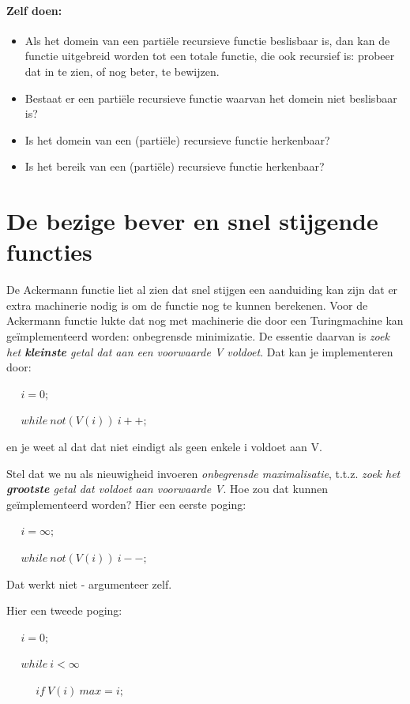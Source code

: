 \paragraph{Zelf doen:}
\begin{itemize}
\item[]
Als het domein van een parti\"ele recursieve functie beslisbaar is, dan
kan de functie uitgebreid worden tot een totale functie, die ook
recursief is: probeer dat in te zien, of nog beter, te bewijzen.
\item[]
Bestaat er een parti\"ele recursieve functie waarvan het domein niet
beslisbaar is?
\item[]
Is het domein van een (parti\"ele) recursieve functie herkenbaar?
\item[]
Is het bereik van een (parti\"ele) recursieve functie herkenbaar?
\end{itemize}



\section{De bezige bever en snel stijgende functies}

De Ackermann functie liet al zien dat snel stijgen een aanduiding kan
zijn dat er extra machinerie nodig is om de functie nog te kunnen
berekenen. Voor de Ackermann functie lukte dat nog met machinerie die
door een Turingmachine kan ge\"{i}mplementeerd worden: onbegrensde
minimizatie. De essentie daarvan is {\em zoek het {\bf kleinste} getal
dat aan een voorwaarde V voldoet}. Dat kan je implementeren door:

$~~~~~~i = 0;$

$~~~~~~while~not(V(i))~i++;$


en je weet al dat dat niet eindigt als geen enkele i voldoet aan V.


Stel dat we nu als nieuwigheid invoeren {\em onbegrensde
maximalisatie}, t.t.z. {\em zoek het {\bf grootste} getal dat voldoet
aan voorwaarde V}. Hoe zou dat kunnen ge\"{i}mplementeerd worden? Hier
een eerste poging:


$~~~~~~i = \infty;$

$~~~~~~while~not(V(i))~i--;$


Dat werkt niet - argumenteer zelf.


Hier een tweede poging: 


$~~~~~~i = 0;$

$~~~~~~while~i < \infty$

$~~~~~~~~~~~~if~V(i)~max = i;$

